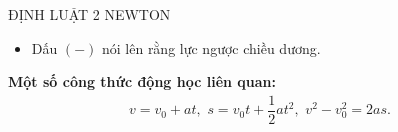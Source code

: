\begin{dang}{ĐỊNH LUẬT 2 NEWTON}
\begin{itemize}
\begin{center}
\end{center}
\item Dấu $(-)$ nói lên rằng lực ngược chiều dương.
\end{itemize}
\Bookmark\textbf{Một số công thức động học liên quan:}
\begin{align*}
v=v_0+at,\,\, s=v_0t+\dfrac{1}{2}at^2,\,\, v^2-v_0^2=2as.
\end{align*}
\end{dang}